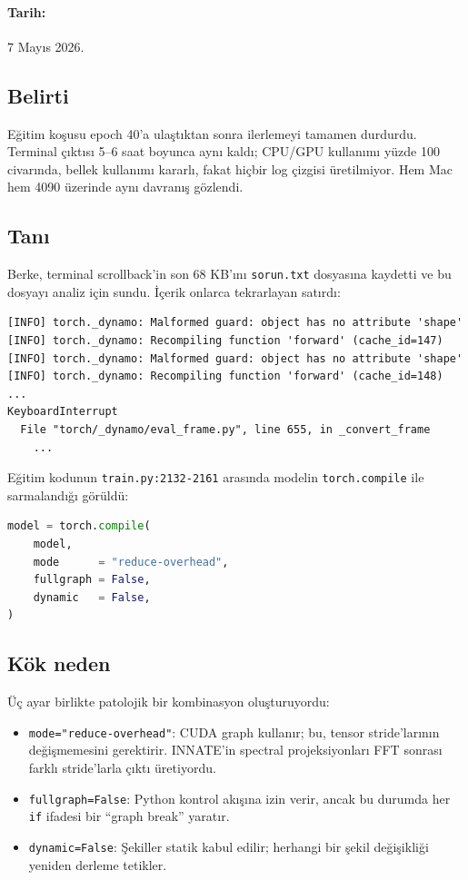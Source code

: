 \paragraph{Tarih:} 7 Mayıs 2026.

\subsection*{Belirti}

Eğitim koşusu epoch 40'a ulaştıktan sonra ilerlemeyi tamamen durdurdu. Terminal çıktısı 5--6 saat boyunca aynı kaldı; CPU/GPU kullanımı yüzde 100 civarında, bellek kullanımı kararlı, fakat hiçbir log çizgisi üretilmiyor. Hem Mac hem 4090 üzerinde aynı davranış gözlendi.

\subsection*{Tanı}

Berke, terminal scrollback'in son 68 KB'ını \texttt{sorun.txt} dosyasına kaydetti ve bu dosyayı analiz için sundu. İçerik onlarca tekrarlayan satırdı:

\begin{lstlisting}[caption={sorun.txt'den alıntı (kısaltılmış)}]
[INFO] torch._dynamo: Malformed guard: object has no attribute 'shape'
[INFO] torch._dynamo: Recompiling function 'forward' (cache_id=147)
[INFO] torch._dynamo: Malformed guard: object has no attribute 'shape'
[INFO] torch._dynamo: Recompiling function 'forward' (cache_id=148)
...
KeyboardInterrupt
  File "torch/_dynamo/eval_frame.py", line 655, in _convert_frame
    ...
\end{lstlisting}

Eğitim kodunun \texttt{train.py:2132-2161} arasında modelin \texttt{torch.compile} ile sarmalandığı görüldü:

\begin{lstlisting}[language=Python,caption={Sorunlu compile çağrısı}]
model = torch.compile(
    model,
    mode      = "reduce-overhead",
    fullgraph = False,
    dynamic   = False,
)
\end{lstlisting}

\subsection*{Kök neden}

Üç ayar birlikte patolojik bir kombinasyon oluşturuyordu:
\begin{itemize}
    \item \texttt{mode="reduce-overhead"}: CUDA graph kullanır; bu, tensor stride'larının değişmemesini gerektirir. INNATE'in spectral projeksiyonları FFT sonrası farklı stride'larla çıktı üretiyordu.
    \item \texttt{fullgraph=False}: Python kontrol akışına izin verir, ancak bu durumda her \texttt{if} ifadesi bir ``graph break'' yaratır.
    \item \texttt{dynamic=False}: Şekiller statik kabul edilir; herhangi bir şekil değişikliği yeniden derleme tetikler.
\end{itemize}

